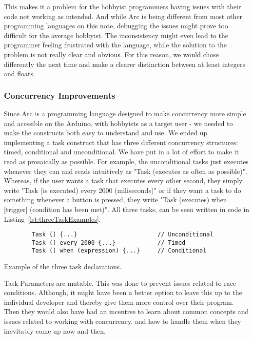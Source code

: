 This makes it a problem for the hobbyist programmers having issues with their code not working as intended. And while Arc is being different from most other programming languages on this note, debugging the issues might prove too difficult for the average hobbyist. The inconsistency might even lead to the programmer feeling frustrated with the language, while the solution to the problem is not really clear and obvious. For this reason, we would chose differently the next time and make a clearer distinction between at least integers and floats.

\subsubsection{Concurrency Improvements}

Since Arc is a programming language designed to make concurrency more simple and acessible on the Arduino, with hobbyists as a target user - we needed to make the constructs both easy to understand and use. We ended up implementing a task construct that has three different concurrency structures: timed, conditional and unconditional. We have put in a lot of effort to make it read as prosaically as possible. For example, the unconditional tasks just executes whenever they can and reads intuitively as "Task (executes as often as possible)". Whereas, if the user wants a task that executes every other second, they simply write "Task (is executed) every 2000 (miliseconds)" or if they want a task to do something whenever a button is pressed, they write "Task (executes) when [trigger] (condition has been met)". All three tasks, can be seen written in code in Listing~\ref{lst:threeTaskExamples}.

\begin{listing}[htb!]
    \begin{verbatim}
        Task () {...}                       // Unconditional
        Task () every 2000 {...}            // Timed
        Task () when (expression) {...}     // Conditional
    \end{verbatim}
    \caption{Example of the three task declarations.}
    \label{lst:threeTaskExamples}
\end{listing}

Task Parameters are mutable. This was done to prevent issues related to race conditions. Although, it might have been a better option to leave this up to the individual developer and thereby give them more control over their program. Then they would also have had an incentive to learn about common concepts and issues related to working with concurrency, and how to handle them when they inevitably come up now and then.

